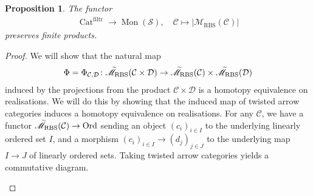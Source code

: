\documentclass[12pt, reqno]{amsart}
\theoremstyle{plain}
\newtheorem{proposition}[theorem]{Proposition}
\theoremstyle{definition}
\begin{document}
\begin{proposition}\label{product preserving}
The functor
\begin{align*}
\operatorname{Cat}^{\operatorname{filtr}}\rightarrow \operatorname{Mon}(\mathcal{S}),\quad \mathcal{C}\mapsto |\mathscr{M}_{\operatorname{RBS}}(\mathcal{C})|
\end{align*}
preserves finite products.
\end{proposition}
\begin{proof}
We will show that the natural map
\begin{align*}
\Phi=\Phi_{\mathcal{C},\mathcal{D}}\colon \accentset{\sim}{\mathscr{M}}_{\operatorname{RBS}}(\mathcal{C}\times \mathcal{D})\rightarrow \accentset{\sim}{\mathscr{M}}_{\operatorname{RBS}}(\mathcal{C})\times \accentset{\sim}{\mathscr{M}}_{\operatorname{RBS}}(\mathcal{D})
\end{align*}
induced by the projections from the product $\mathcal{C}\times \mathcal{D}$ is a homotopy equivalence on realisations. We will do this by showing that the induced map of twisted arrow categories induces a homotopy equivalence on realisations. For any $\mathcal{C}$, we have a functor $\accentset{\sim}{\mathscr{M}}_{\operatorname{RBS}}(\mathcal{C})\rightarrow \operatorname{Ord}$ sending an object $(c_i)_{i\in I}$ to the underlying linearly ordered set $I$, and a morphism $(c_i)_{i\in I}\rightarrow (d_j)_{j\in J}$ to the underlying map $I\rightarrow J$ of linearly ordered sets. Taking twisted arrow categories yields a commutative diagram.
\begin{center}
\end{center}


\end{proof}
\end{document}
